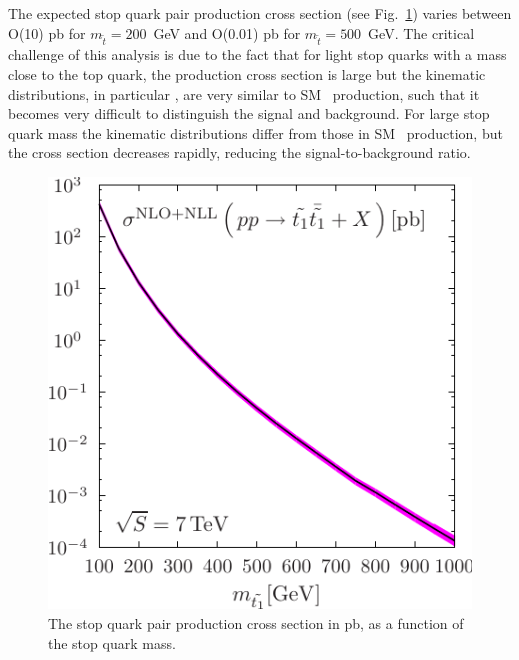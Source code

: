 The expected stop quark pair production cross section (see Fig.~\ref{fig:stopxsec}) varies between O(10) pb
for $m_{\tilde{t}}=200$~GeV and O(0.01) pb for $m_{\tilde{t}}=500$~GeV. The critical challenge of this analysis
is due to the fact that for light stop quarks with a mass close to the top quark, the production cross section is
large but the kinematic distributions, in particular \mt, are very similar to SM \ttbar\ production, such that it becomes very
difficult to distinguish the signal and background. For large stop quark mass the kinematic distributions differ
from those in SM \ttbar\ production, but the cross section decreases rapidly, reducing the signal-to-background
ratio.

\begin{figure}[hbt]
  \begin{center}
	\includegraphics[width=0.5\linewidth]{plots/total_scale_pdf_LHC-eps-converted-to.pdf}
	\caption{
	  \label{fig:stopxsec}\protect 
          The stop quark pair production cross section in pb, as a function of the stop quark mass.}
  \end{center}
\end{figure}

